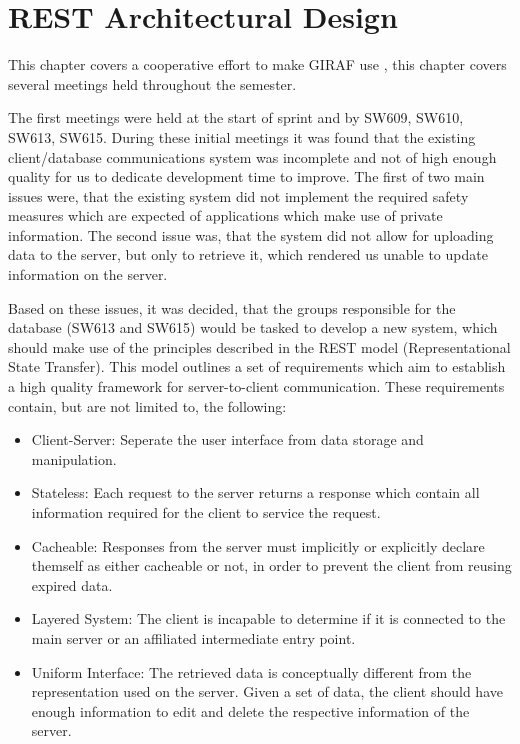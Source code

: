 \chapter{REST Architectural Design}\label{S1CS}
This chapter covers a cooperative effort to make GIRAF use , this
chapter covers several meetings held throughout the semester.\nl

The first meetings were held at the start of sprint and by SW609, SW610, SW613,
SW615. During these initial meetings it was found that the existing
client/database communications system was incomplete and not of high enough
quality for us to dedicate development time to improve. The first of two main
issues were, that the existing system did not implement the required safety
measures which are expected of applications which make use of private
information. The second issue was, that the system did not allow for uploading
data to the server, but only to retrieve it, which rendered us unable to update
information on the server.\nl

Based on these issues, it was decided, that the groups responsible for the
database (SW613 and SW615) would be tasked to develop a new system, which should
make use of the principles described in the REST model (Representational State
Transfer)\citep{RESTInfo}. This model outlines a set of requirements which aim
to establish a high quality framework for server-to-client communication. These
requirements contain, but are not limited to, the following:

\begin{itemize}
  \item Client-Server: Seperate the user interface from data storage and
  manipulation.
  \item Stateless: Each request to the server returns a response which contain
  all information required for the client to service the request.
  \item Cacheable: Responses from the server must implicitly or explicitly
  declare themself as either cacheable or not, in order to prevent the client
  from reusing expired data.
  \item Layered System: The client is incapable to determine if it is connected
  to the main server or an affiliated intermediate entry point.
  \item Uniform Interface: The retrieved data is conceptually different from the
  representation used on the server. Given a set of data, the client should have
  enough information to edit and delete the respective information of the
  server. 
\end{itemize}

